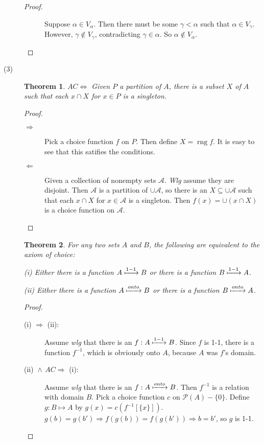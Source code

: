\documentclass[12pt]{article}
\DeclareMathOperator{\rng}{rng}
\newcommand{\power}[1]{\mathscr{P}(#1)}
\newtheorem*{theorem*}{Theorem}
\begin{document}
\begin{description}
\begin{proof}
\begin{description}
Suppose $\alpha \in V_\alpha$.  Then there must be some $\gamma <
\alpha$ such that $\alpha \in V_\gamma$.  However, $\gamma \not\in
V_\gamma$, contradicting $\gamma \in \alpha$.  So $\alpha \not\in
V_\alpha$.
\end{description}
\end{proof}

\item[(3)]
\begin{theorem*}
  $AC \Leftrightarrow$ Given $P$ a partition of $A$, there is a subset
  $X$ of $A$ such that each $x \cap X$ for $x \in P$ is a singleton.
\end{theorem*}

\begin{proof}
\begin{description}
\item[$\Rightarrow$] Pick a choice function $f$ on $P$.  Then define $X
= \rng{f}$.  It is easy to see that this satifies the conditions.
\item[$\Leftarrow$] Given a collection of nonempty sets $\mathscr{A}$.
\textit{Wlg} assume they are disjoint.  Then $\mathscr{A}$ is a
partition of $\cup \mathscr{A}$, so there is an $X \subseteq \cup
\mathscr{A}$ such that each $x \cap X$ for $x \in \mathscr{A}$ is a
singleton.  Then $f(x) = \cup(x \cap X)$ is a choice function on
$\mathscr{A}$.
\end{description}
\end{proof}

\begin{theorem*}
  For any two sets $A$ and $B$, the following are equivalent to the
  axiom of choice:  
    
	(i) Either there is a function $A \xmapsto{1-1} B$ or there
	is a function $B \xmapsto{1-1} A$.
	
	(ii) Either there is a function $A \xmapsto{onto} B$ or there
	is a function $B \xmapsto{onto} A$.
\end{theorem*}
\begin{proof}
 \begin{description}
 \item[(i) $\Rightarrow$ (ii):]  
 Assume \textit{wlg} that there is an $f: A \xmapsto{1-1} B$.  Since $f$
 is 1-1, there is a function $f^{-1}$, which is obviously onto $A$,
 because $A$ was $f$'s domain.
 
 \item[(ii) $\!\wedge\, AC \Rightarrow$ (i):]
 Assume \textit{wlg} that there is an $f: A \xmapsto{onto} B$.  Then
 $f^{-1}$ is a relation with domain $B$.  Pick a choice function $c$ on
 $\power{A}-\{0\}$.  Define $g: B \mapsto A$ by $g(x) =
 c(f^{-1}[\{x\}])$.  $g(b) = g(b') \Rightarrow f(g(b)) = f(g(b'))
 \Rightarrow b = b'$, so $g$ is 1-1.
 

\end{description}
\end{proof}
\end{description}
\end{document}
